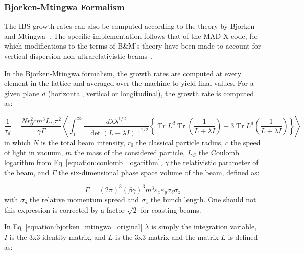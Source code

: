 \subsubsection{Bjorken-Mtingwa Formalism}

The IBS growth rates can also be computed according to the theory by Bjorken and Mtingwa~\cite{CERN:Bjorken_Mtingwa:Intrabeam_Scattering}.
The specific implementation follows that of the MAD-X code, for which modifications to the terms of B\&M's theory have been made to account for vertical dispersion non-ultrarelativistic beams~\cite{CERN:Antoniou:Revision_IBS_MADX}.
\newline

In the Bjorken-Mtingwa formalism, the growth rates are computed at every element in the lattice and averaged over the machine to yield final values.
For a given plane \(d\) (horizontal, vertical or longitudinal), the growth rate is computed as:

\begin{equation}
    \frac{1}{\tau_d} = \frac{N r_0^{2} c m^3 L_C \pi^{2}}{\gamma \Gamma} \left\langle \int_0^{\infty} \frac{d \lambda \lambda^{1 / 2}}{\left[\operatorname{det}(L + \lambda I)\right]^{1/2}} \left\{\operatorname{Tr} L^d \operatorname{Tr}\left(\frac{1}{L + \lambda I}\right) - 3 \operatorname{Tr} L^d \left(\frac{1}{L + \lambda I}\right)\right\}\right\rangle
    \label{equation:bjorken_mtingwa_original}
\end{equation}
in which \(N\) is the total beam intensity, \(r_0\) the classical particle radius, \(c\) the speed of light in vacuum, \(m\) the mass of the considered particle, \(L_C\) the Coulomb logarithm from Eq~\eqref{equation:coulomb_logarithm}, \(\gamma\) the relativistic parameter of the beam, and \(\Gamma\) the six-dimensional phase space volume of the beam, defined as:

\begin{equation}
    \Gamma = \left( 2 \pi \right)^3 \left( \beta \gamma \right)^3 m^3 \varepsilon_x \varepsilon_y \sigma_{\delta} \sigma_z
\end{equation}
with \(\sigma_{\delta}\) the relative momentum spread and \(\sigma_z\) the bunch length.
One should not this expression is corrected by a factor \(\sqrt{2}\) for coasting beams.

In Eq~\eqref{equation:bjorken_mtingwa_original} \(\lambda\) is simply the integration variable, \(I\) is the 3x3 identity matrix, and \(L\) is the 3x3 matrix and the matrix \(L\) is defined as:

